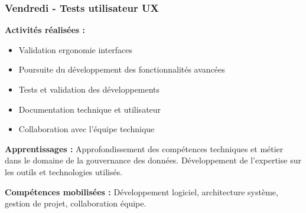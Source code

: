 \subsubsection{Vendredi - Tests utilisateur UX}

\textbf{Activités réalisées :}
\begin{itemize}
    \item Validation ergonomie interfaces
    \item Poursuite du développement des fonctionnalités avancées
    \item Tests et validation des développements
    \item Documentation technique et utilisateur
    \item Collaboration avec l'équipe technique
\end{itemize}

\textbf{Apprentissages :}
Approfondissement des compétences techniques et métier dans le domaine de la gouvernance des données. Développement de l'expertise sur les outils et technologies utilisés.

\textbf{Compétences mobilisées :}
Développement logiciel, architecture système, gestion de projet, collaboration équipe.


